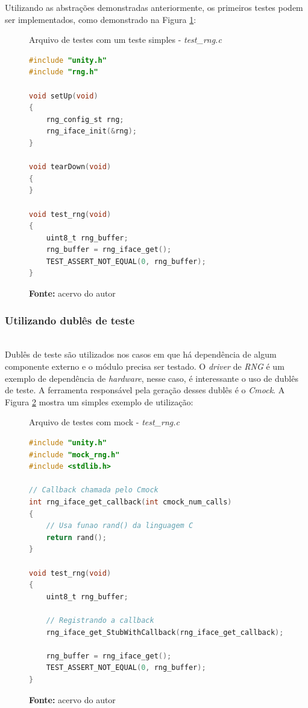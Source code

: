 \documentclass[times, twoside, watermark]{artigo}
\begin{document}
Utilizando as abstrações demonstradas anteriormente, os primeiros testes podem ser
implementados, como demonstrado na Figura \ref{fig:simple-test}:\hfill\\

\begin{figure}[H]
  \centering
  \caption{Arquivo de testes com um teste simples  - \textit{test\_rng.c}}
\begin{lstlisting}[language=C]
#include "unity.h"
#include "rng.h"

void setUp(void)
{
	rng_config_st rng;
	rng_iface_init(&rng);	
}

void tearDown(void)
{
}

void test_rng(void)
{	
	uint8_t rng_buffer;
	rng_buffer = rng_iface_get();
	TEST_ASSERT_NOT_EQUAL(0, rng_buffer);
}
\end{lstlisting}
  \label{fig:simple-test}
  \caption*{\newline\textbf{Fonte:} acervo do autor}
\end{figure}

\subsubsection{Utilizando dublês de teste}\hfill\\

Dublês de teste são utilizados nos casos em que há dependência de algum componente
externo e o módulo precisa ser testado. O \textit{driver} de \textit{RNG} é um
exemplo de dependência de \textit{hardware}, nesse caso, é interessante o uso
de dublês de teste. A ferramenta responsável pela geração desses dublês é o
\textit{Cmock}. A Figura \ref{fig:mock-test} mostra um simples exemplo de utilização:
\hfill\\

\begin{figure}[H]
  \centering
  \caption{Arquivo de testes com mock - \textit{test\_rng.c}}
\begin{lstlisting}[language=C]
#include "unity.h"
#include "mock_rng.h"
#include <stdlib.h>

// Callback chamada pelo Cmock
int rng_iface_get_callback(int cmock_num_calls)
{
	// Usa funao rand() da linguagem C
	return rand();
}

void test_rng(void)
{
	uint8_t rng_buffer;

	// Registrando a callback
	rng_iface_get_StubWithCallback(rng_iface_get_callback);
       
	rng_buffer = rng_iface_get();
	TEST_ASSERT_NOT_EQUAL(0, rng_buffer);
}
\end{lstlisting}
  \label{fig:mock-test}
  \caption*{\newline\textbf{Fonte:} acervo do autor}
\end{figure}
\end{document}
